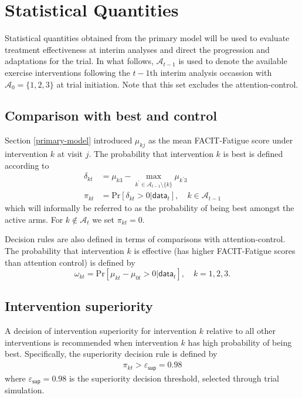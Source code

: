 \documentclass[11pt,parskip=half-]{scrartcl}
\begin{document}
\section{Statistical Quantities}\label{statistical-quantities}

Statistical quantities obtained from the primary model will be used to evaluate treatment effectiveness at interim analyses and direct the progression and adaptations for the trial. In what follows, $\mathcal{A}_{t-1}$ is used to denote the available exercise interventions following the $t-1$th interim analysis occassion with $\mathcal{A}_0=\{1,2,3\}$ at trial initiation. Note that this set excludes the attention-control.

\subsection{Comparison with best and control}\label{comparison-wth-best}

Section \ref{primary-model} introduced $\mu_{kj}$ as the mean FACIT-Fatigue score under intervention $k$ at visit $j$. The probability that intervention $k$ is best is defined according to
$$
  \begin{aligned}
    \delta_{kt} & = \mu_{k3} - \underset{k^\prime\in\mathcal{A}_{t-1}\setminus\{k\}}{\max}\mu_{k^\prime 3} \\
    \pi_{kt}    & = \text{Pr}[\delta_{kt}>0|\mathsf{data}_t], \quad k \in \mathcal{A}_{t-1}
  \end{aligned}
$$
which will informally be referred to as the probability of being best amongst the active arms. For $k\notin\mathcal{A}_t$ we set $\pi_{kt}=0$.

Decision rules are also defined in terms of comparisons with attention-control. The probability that intervention $k$ is effective (has higher FACIT-Fatigue scores than attention control) is defined by
$$
  \omega_{kt} = \text{Pr}[\mu_{kt} - \mu_{0t} > 0 | \mathsf{data}_t], \quad k =1,2,3.
$$

\subsection{Intervention superiority}\label{intervention-superiority}

A decision of intervention superiority for intervention $k$ relative to all other interventions is recommended when intervention $k$ has high probability of being best. Specifically, the superiority decision rule is defined by
$$
  \begin{aligned}
    \pi_{kt} > \varepsilon_{\mathsf{sup}} = 0.98
  \end{aligned}
$$
where $\varepsilon_{\mathsf{sup}} = 0.98$ is the superiority decision threshold, selected through trial simulation.
\end{document}

